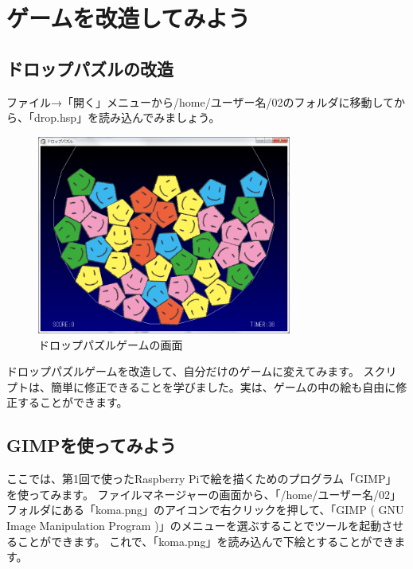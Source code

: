 \clearpage

\section{ゲームを改造してみよう}
\subsection{ドロップパズルの改造}

ファイル→「開く」メニューから/home/ユーザー名/02のフォルダに移動してから、「drop.hsp」を読み込んでみましょう。

\begin{figure}[H]
    \begin{center}
        \includegraphics[keepaspectratio,width=8.356cm,height=6.544cm]{text02-img/text02-img015.png}
        \caption{ドロップパズルゲームの画面}
    \end{center}
\end{figure}

ドロップパズルゲームを改造して、自分だけのゲームに変えてみます。
スクリプトは、簡単に修正できることを学びました。実は、ゲームの中の絵も自由に修正することができます。

\subsection{GIMPを使ってみよう}

ここでは、第1回で使ったRaspberry Piで絵を描くためのプログラム「GIMP」を使ってみます。
ファイルマネージャーの画面から、「/home/ユーザー名/02」フォルダにある「koma.png」のアイコンで右クリックを押して、「GIMP ( GNU Image Manipulation Program )」のメニューを選ぶすることでツールを起動させることができます。
これで、「koma.png」を読み込んで下絵とすることができます。

